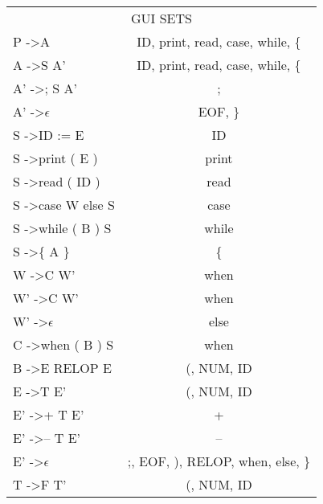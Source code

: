 \documentclass[12pt]{article}
\begin{document}
\begin{table}[]
    \centering
    \begin{tabular}{|l|c|}
    \multicolumn{2}{|c|}{GUI SETS}                                         \\
    P -\textgreater A             & ID, print, read, case, while, \{       \\
    A -\textgreater S A'          & ID, print, read, case, while, \{       \\
    A' -\textgreater ; S A'       & ;                                      \\
    A' -\textgreater $\epsilon$            & EOF, \}                                \\
    S -\textgreater ID := E       & ID                                     \\
    S -\textgreater print ( E )   & print                                  \\
    S -\textgreater read ( ID )   & read                                   \\
    S -\textgreater case W else S & case                                   \\
    S -\textgreater while ( B ) S & while                                  \\
    S -\textgreater \{ A \}       & \{                                     \\
    W -\textgreater C W'          & when                                   \\
    W' -\textgreater C W'         & when                                   \\
    W' -\textgreater $\epsilon$            & else                                   \\
    C -\textgreater when ( B ) S  & when                                   \\
    B -\textgreater E RELOP E     & (, NUM, ID                             \\
    E -\textgreater T E'          & (, NUM, ID                             \\
    E' -\textgreater + T E'       & +                                      \\
    E' -\textgreater – T E'       & –                                      \\
    E' -\textgreater $\epsilon$            & ;, EOF, ), RELOP, when, else, \}       \\
    T -\textgreater F T'          & (, NUM, ID                             \\

\end{tabular}
\end{table}
\end{document}
